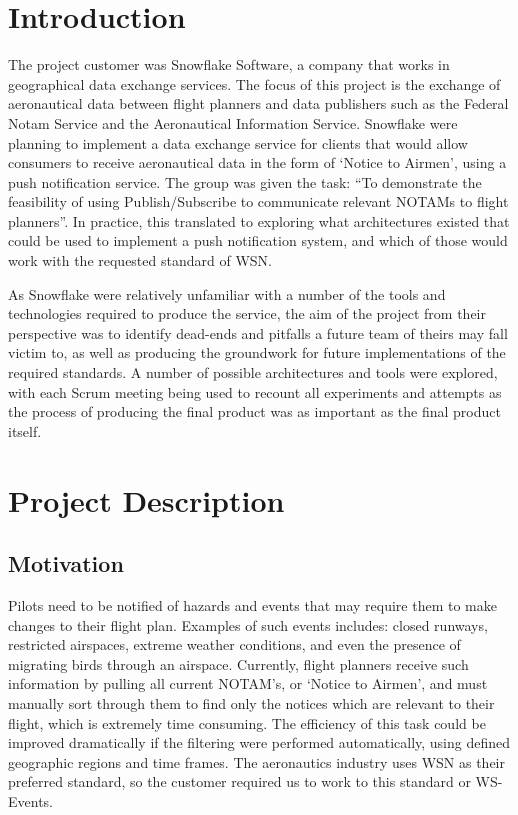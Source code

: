 \documentclass[a4paper, 12pt, twoside]{article}
\begin{document}
\newpage

\tableofcontents
\newpage

\listoffigures
\newpage

\section{Introduction}
\label{sec:introduction}

The project customer was Snowflake Software, a company that works in geographical data exchange services. The focus of this project is the exchange of aeronautical data between flight planners and data publishers such as the Federal Notam Service and the Aeronautical Information Service. Snowflake were planning to implement a data exchange service for clients that would allow consumers to receive aeronautical data in the form of `Notice to Airmen', using a push notification service. The group was given the task: ``To demonstrate the feasibility of using Publish/Subscribe to communicate relevant NOTAMs to flight planners''. In practice, this translated to exploring what architectures existed that could be used to implement a push notification system, and which of those would work with the requested standard of WSN.

As Snowflake were relatively unfamiliar with a number of the tools and technologies required to produce the service, the aim of the project from their perspective was to identify dead-ends and pitfalls a future team of theirs may fall victim to, as well as producing the groundwork for future implementations of the required standards. A number of possible architectures and tools were explored, with each Scrum meeting being used to recount all experiments and attempts as the process of producing the final product was as important as the final product itself.

\newpage

\section{Project Description}
\subsection{Motivation}
\label{sec:intro_motivation}
Pilots need to be notified of hazards and events that may require them to make changes to their flight plan. Examples of such events includes: closed runways, restricted airspaces, extreme weather conditions, and even the presence of migrating birds through an airspace. Currently, flight planners receive such information by pulling all current NOTAM's, or `Notice to Airmen', and must manually sort through them to find only the notices which are relevant to their flight, which is extremely time consuming. The efficiency of this task could be improved dramatically if the filtering were performed automatically, using defined geographic regions and time frames. The aeronautics industry uses WSN as their preferred standard, so the customer required us to work to this standard or WS-Events.
\end{document}
